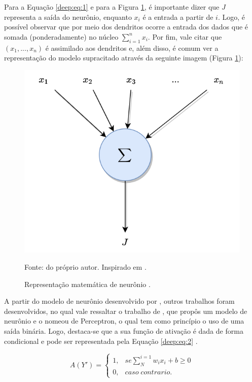 Para a Equação \ref{deep:eq:1} e para a Figura \ref{deep:fig:2}, é importante dizer que $J$ representa a saída do neurônio, enquanto $x_i$ é a entrada a partir de $i$. Logo, é possível observar que por meio dos dendritos ocorre a entrada dos dados que é somada (ponderadamente) no núcleo $\sum_{i = 1}^{n} x_i$. Por fim, vale citar que $(x_1, ..., x_n)$ é assimilado aos dendritos e, além disso, é comum ver a representação do modelo supracitado através da seguinte imagem (Figura \ref{deep:fig:2}):

\begin{figure}[H]
    \centering
    \caption{Representação matemática de neurônio \cite{mcculloch1943logical}.}
    \includegraphics[width=1\linewidth]{recursos/imagens/deep/neuronio_mc.png}
    \label{deep:fig:2}

    Fonte: do próprio autor. Inspirado em \cite{mcculloch1943logical}.
\end{figure}

A partir do modelo de neurônio desenvolvido por \cite{mcculloch1943logical},  outros trabalhos foram desenvolvidos, no qual vale ressaltar o trabalho de \cite{Rosenblatt1958}, que propôs um modelo de neurônio e o nomeou de Perceptron, o qual tem como princípio o uso de uma saída binária. Logo, destaca-se que a sua função de ativação é dada de forma condicional e pode ser representada pela Equação \ref{deep:eq:2} \citep{Rosenblatt1958}.

\begin{equation}
    \label{deep:eq:2}
    A(Y') = \left\{\begin{matrix}
     1,& se \sum_{N}^{i=1} w_i x_i + b \geq 0 \\ 
     0,& caso \;  contrario.
    \end{matrix}\right.
\end{equation}


